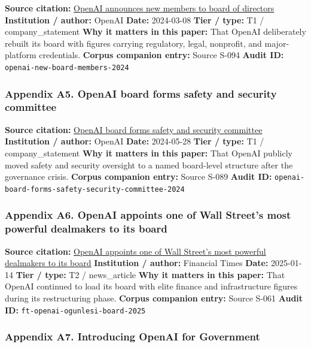 \documentclass[
  american,
  11pt,
  letterpaper,
]{article}
\begin{document}
\textbf{Source citation:}
\href{https://openai.com/index/openai-announces-new-members-to-board-of-directors/}{OpenAI
announces new members to board of directors} \textbf{Institution /
author:} OpenAI \textbf{Date:} 2024-03-08 \textbf{Tier / type:} T1 /
company\_statement \textbf{Why it matters in this paper:} That OpenAI
deliberately rebuilt its board with figures carrying regulatory, legal,
nonprofit, and major-platform credentials. \textbf{Corpus companion
entry:} Source S-094 \textbf{Audit ID:}
\texttt{openai-new-board-members-2024}

\subsubsection{Appendix A5. OpenAI board forms safety and security
committee}\label{appendix-a5-openai-board-forms-safety-and-security-committee}

\textbf{Source citation:}
\href{https://openai.com/index/openai-board-forms-safety-and-security-committee/}{OpenAI
board forms safety and security committee} \textbf{Institution /
author:} OpenAI \textbf{Date:} 2024-05-28 \textbf{Tier / type:} T1 /
company\_statement \textbf{Why it matters in this paper:} That OpenAI
publicly moved safety and security oversight to a named board-level
structure after the governance crisis. \textbf{Corpus companion entry:}
Source S-089 \textbf{Audit ID:}
\texttt{openai-board-forms-safety-security-committee-2024}

\subsubsection{Appendix A6. OpenAI appoints one of Wall Street's most
powerful dealmakers to its
board}\label{appendix-a6-openai-appoints-one-of-wall-street-s-most-powerful-dealmakers-to-its-board}

\textbf{Source citation:}
\href{https://www.ft.com/content/63b08a9d-e537-4d60-9904-c59958a16982}{OpenAI
appoints one of Wall Street's most powerful dealmakers to its board}
\textbf{Institution / author:} Financial Times \textbf{Date:} 2025-01-14
\textbf{Tier / type:} T2 / news\_article \textbf{Why it matters in this
paper:} That OpenAI continued to load its board with elite finance and
infrastructure figures during its restructuring phase. \textbf{Corpus
companion entry:} Source S-061 \textbf{Audit ID:}
\texttt{ft-openai-ogunlesi-board-2025}

\subsubsection{Appendix A7. Introducing OpenAI for
Government}\label{appendix-a7-introducing-openai-for-government}
\end{document}
